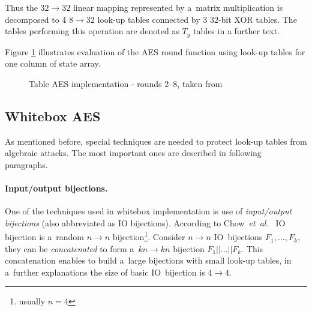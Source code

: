 \documentclass[11pt,oneside,final]{fithesis2}
\newcommand{\eal}{\emph{et~al.}}
\begin{document}
    Thus the $32\rightarrow32$ linear mapping represented by a~matrix multiplication is decomposed to 4 $8\rightarrow32$ look-up tables
    connected by 3 32-bit XOR tables. The tables performing this operation are denoted as $T_y$ tables in a further text.

    Figure \ref{fig:table_aes} illustrates evaluation of the AES round function using look-up tables for one column of state array.

    \begin{figure}[!htb]
    \begin{center}
    \leavevmode
    \centerline{}
    \end{center}
    \caption{Table AES implementation - rounds 2--8, taken from~\citep{Muir_atutorial}}
    \label{fig:table_aes}
    \end{figure}
    
    \subsection{Whitebox AES}\label{sec:whitebox_aes_scheme_chow}
    As mentioned before, special techniques are needed to protect look-up tables from algebraic attacks. The most important ones 
    are described in following paragraphs.
    
    \paragraph*{Input/output bijections.}
    One of the techniques used in whitebox implementation is use of \emph{input/output bijections} (also abbreviated as IO bijections).
    According to Chow~\eal~\citep{Chow02white-boxcryptography} IO bijection is a~random $n\rightarrow n$ bijection\footnote{usually $n=4$}. 
    Consider $n\rightarrow n$ IO~bijections $F_1,\dots,F_k$, they can be \emph{concatenated} to form a~$kn \rightarrow kn$ bijection 
    $F_1||\dots || F_k$. This concatenation enables to build a~large bijections with small look-up tables, in a~further explanations the size of basic 
    IO~bijection is $4 \rightarrow 4$.
    
\end{document}
